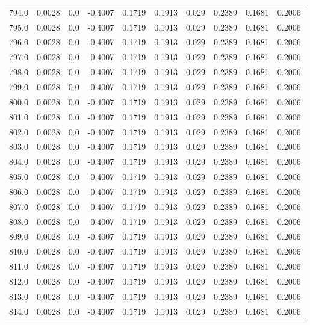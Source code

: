\begin{longtable}{lrrrrrrrrr}
794.0 & 0.0028 & 0.0 & -0.4007 & 0.1719 & 0.1913 & 0.029 & 0.2389 & 0.1681 & 0.2006 \\
795.0 & 0.0028 & 0.0 & -0.4007 & 0.1719 & 0.1913 & 0.029 & 0.2389 & 0.1681 & 0.2006 \\
796.0 & 0.0028 & 0.0 & -0.4007 & 0.1719 & 0.1913 & 0.029 & 0.2389 & 0.1681 & 0.2006 \\
797.0 & 0.0028 & 0.0 & -0.4007 & 0.1719 & 0.1913 & 0.029 & 0.2389 & 0.1681 & 0.2006 \\
798.0 & 0.0028 & 0.0 & -0.4007 & 0.1719 & 0.1913 & 0.029 & 0.2389 & 0.1681 & 0.2006 \\
799.0 & 0.0028 & 0.0 & -0.4007 & 0.1719 & 0.1913 & 0.029 & 0.2389 & 0.1681 & 0.2006 \\
800.0 & 0.0028 & 0.0 & -0.4007 & 0.1719 & 0.1913 & 0.029 & 0.2389 & 0.1681 & 0.2006 \\
801.0 & 0.0028 & 0.0 & -0.4007 & 0.1719 & 0.1913 & 0.029 & 0.2389 & 0.1681 & 0.2006 \\
802.0 & 0.0028 & 0.0 & -0.4007 & 0.1719 & 0.1913 & 0.029 & 0.2389 & 0.1681 & 0.2006 \\
803.0 & 0.0028 & 0.0 & -0.4007 & 0.1719 & 0.1913 & 0.029 & 0.2389 & 0.1681 & 0.2006 \\
804.0 & 0.0028 & 0.0 & -0.4007 & 0.1719 & 0.1913 & 0.029 & 0.2389 & 0.1681 & 0.2006 \\
805.0 & 0.0028 & 0.0 & -0.4007 & 0.1719 & 0.1913 & 0.029 & 0.2389 & 0.1681 & 0.2006 \\
806.0 & 0.0028 & 0.0 & -0.4007 & 0.1719 & 0.1913 & 0.029 & 0.2389 & 0.1681 & 0.2006 \\
807.0 & 0.0028 & 0.0 & -0.4007 & 0.1719 & 0.1913 & 0.029 & 0.2389 & 0.1681 & 0.2006 \\
808.0 & 0.0028 & 0.0 & -0.4007 & 0.1719 & 0.1913 & 0.029 & 0.2389 & 0.1681 & 0.2006 \\
809.0 & 0.0028 & 0.0 & -0.4007 & 0.1719 & 0.1913 & 0.029 & 0.2389 & 0.1681 & 0.2006 \\
810.0 & 0.0028 & 0.0 & -0.4007 & 0.1719 & 0.1913 & 0.029 & 0.2389 & 0.1681 & 0.2006 \\
811.0 & 0.0028 & 0.0 & -0.4007 & 0.1719 & 0.1913 & 0.029 & 0.2389 & 0.1681 & 0.2006 \\
812.0 & 0.0028 & 0.0 & -0.4007 & 0.1719 & 0.1913 & 0.029 & 0.2389 & 0.1681 & 0.2006 \\
813.0 & 0.0028 & 0.0 & -0.4007 & 0.1719 & 0.1913 & 0.029 & 0.2389 & 0.1681 & 0.2006 \\
814.0 & 0.0028 & 0.0 & -0.4007 & 0.1719 & 0.1913 & 0.029 & 0.2389 & 0.1681 & 0.2006 \\

\end{longtable}
